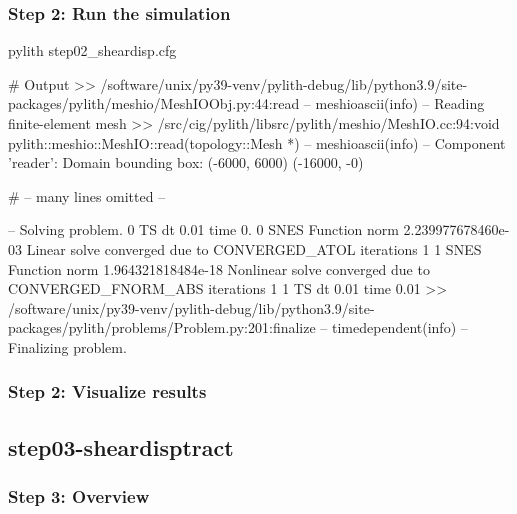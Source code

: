 \documentclass[aspectratio=169]{beamer}
\begin{document}
\begin{frame}[fragile]
  \frametitle{Step 2: Run the simulation}
  \summary{}

\begin{bashcode}
pylith step02_sheardisp.cfg

# Output
 >> /software/unix/py39-venv/pylith-debug/lib/python3.9/site-packages/pylith/meshio/MeshIOObj.py:44:read
 -- meshioascii(info)
 -- Reading finite-element mesh
 >> /src/cig/pylith/libsrc/pylith/meshio/MeshIO.cc:94:void pylith::meshio::MeshIO::read(topology::Mesh *)
 -- meshioascii(info)
 -- Component 'reader': Domain bounding box:
    (-6000, 6000)
    (-16000, -0)

# -- many lines omitted --

 -- Solving problem.
0 TS dt 0.01 time 0.
    0 SNES Function norm 2.239977678460e-03 
    Linear solve converged due to CONVERGED_ATOL iterations 1
    1 SNES Function norm 1.964321818484e-18 
  Nonlinear solve converged due to CONVERGED_FNORM_ABS iterations 1
1 TS dt 0.01 time 0.01
 >> /software/unix/py39-venv/pylith-debug/lib/python3.9/site-packages/pylith/problems/Problem.py:201:finalize
 -- timedependent(info)
 -- Finalizing problem.
\end{bashcode}
  
\end{frame}


\begin{frame}
  \frametitle{Step 2: Visualize results}

    
\end{frame}


\subsection{step03-sheardisptract}

\begin{frame}
  \frametitle{Step 3: Overview}

      
\end{frame}
\end{document}
